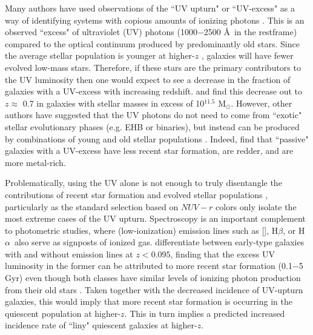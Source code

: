 \documentclass[twocolumn,natbib,iop,hyperref]{aastex62}
\newcommand{\msol}{M$_{\odot}$}
\newcommand{\hb}{H$\beta$}
\newcommand{\oii}{[\ion{O}{2}]}
\newcommand{\ha}{H$\alpha$}
\begin{document}
Many authors have used observations of the ``UV upturn" or ``UV-excess" as a way of identifying systems with copious amounts of ionizing photons \cite[][and references therein]{2008ASPC..392....3Y}.  This is an observed ``excess" of ultraviolet (UV) photons (1000$-$2500 \AA\ in the restframe) compared to the optical continuum produced by predominantly old stars.  Since the average stellar population is younger at higher-$z$ \citep{2014ApJ...788...72G}, galaxies will have fewer evolved low-mass stars.  Therefore, if these stars are the primary contributors to the UV luminosity then one would expect to see a decrease in the fraction of galaxies with a UV-excess with increasing redshift.   \citet{2016MNRAS.461..766L} and \citet{2018MNRAS.480.2236A} find this decrease out to $z \approx$ 0.7 in galaxies with stellar masses in excess of 10$^{11.5}$ \msol.  However, other authors have suggested that the UV photons do not need to come from ``exotic" stellar evolutionary phases (e.g. EHB or binaries), but instead can be produced by combinations of young and old stellar populations \citep{2020MNRAS.497.3251W}.  Indeed, \citet{2021MNRAS.500.1870D} find that ``passive" galaxies with a UV-excess have less recent star formation, are redder, and are more metal-rich. 

Problematically, using the UV alone is not enough to truly disentangle the contributions of recent star formation and evolved stellar populations \cite[e.g.][]{2000ApJ...541..126M}, particularly as the standard selection based on $NUV-r$ colors only isolate the most extreme cases of the UV upturn.  Spectroscopy is an important complement to photometric studies, where (low-ionization) emission lines such as \oii, \hb, or \ha\ also serve as signposts of ionized gas.  \citet{2018MNRAS.481.1774H} differentiate between early-type galaxies with and without emission lines at $z < 0.095$, finding that the excess UV luminosity in the former can be attributed to more recent star formation (0.1$-$5 Gyr) even though both classes have similar levels of ionizing photon production from their old stars \cite[see also][]{2011MNRAS.413.1687C}.  Taken together with the decreased incidence of UV-upturn galaxies, this would imply that more recent star formation is occurring in the quiescent population at higher-$z$.  This in turn implies a predicted increased incidence rate of ``liny" quiescent galaxies at higher-$z$.
\end{document}

